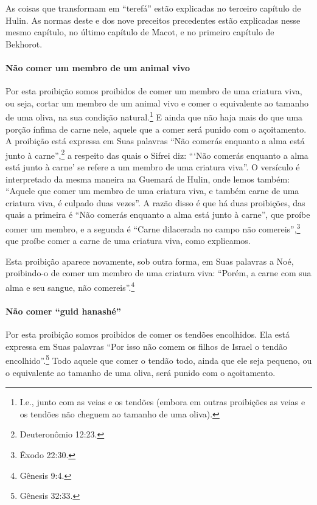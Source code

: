 As coisas que transformam em ``terefá'' estão explicadas no terceiro
capítulo de Hulin. As normas deste e dos nove preceitos precedentes
estão explicadas nesse mesmo capítulo, no último capítulo de Macot, e no
primeiro capítulo de Bekhorot.

\paragraph{Não comer um membro de um animal vivo}

Por esta proibição somos proibidos de comer um membro de uma criatura
viva, ou seja, cortar um membro de um animal vivo e comer o equivalente
ao tamanho de uma oliva, na sua condição natural.\footnote{I.e., junto com as veias e os tendões (embora em outras proibições as
  veias e os tendões não cheguem ao tamanho de uma oliva).}
E ainda que não haja mais do que uma porção ínfima de carne nele, aquele
que a comer será punido com o açoitamento. A proibição está expressa em
Suas palavras ``Não comerás enquanto a alma está junto à carne'',\footnote{Deuteronômio 12:23.} a respeito das quais o Sifrei diz: ```Não comerás
enquanto a alma está junto à carne' se refere a um membro de uma
criatura viva''. O versículo é interpretado da mesma maneira na Guemará
de Hulin, onde lemos também: ``Aquele que comer um membro de uma criatura viva, e também carne de uma criatura
viva, é culpado duas vezes''. A razão disso é que há duas proibições,
das quais a primeira é ``Não comerás enquanto a alma está junto à
carne'', que proíbe comer um membro, e a segunda é ``Carne dilacerada no
campo não comereis'',\footnote{Êxodo 22:30.} que proíbe comer a carne de uma
criatura viva, como explicamos.

Esta proibição aparece novamente, sob outra forma, em Suas palavras a
Noé, proibindo-o de comer um membro de uma criatura viva: ``Porém, a
carne com sua alma e seu sangue, não comereis''.\footnote{Gênesis 9:4.}

\paragraph{Não comer ``guid hanashé''}

Por esta proibição somos proibidos de comer os tendões encolhidos. Ela
está expressa em Suas palavras ``Por isso não comem os filhos de Israel
o tendão encolhido''.\footnote{Gênesis 32:33.} Todo aquele que comer o tendão
todo, ainda que ele seja pequeno, ou o equivalente ao tamanho de uma
oliva, será punido com o açoitamento.

